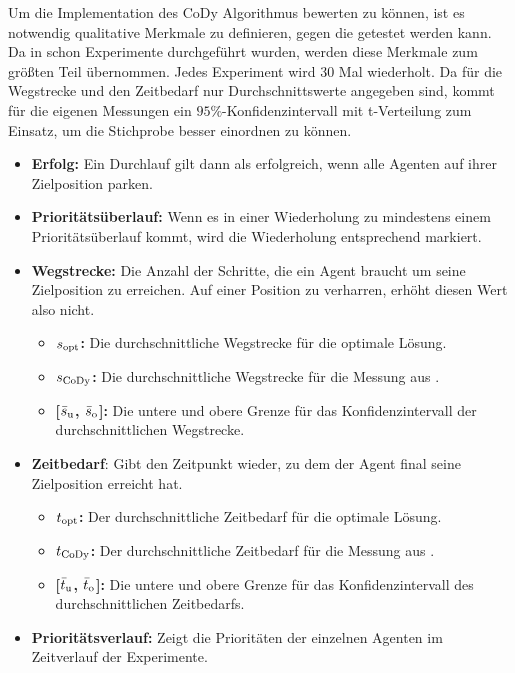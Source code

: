 Um die Implementation des CoDy Algorithmus bewerten zu können, ist es notwendig qualitative Merkmale zu definieren, gegen die getestet werden kann. Da in \cite{book:regele} schon Experimente durchgeführt wurden, werden diese Merkmale zum größten Teil übernommen. Jedes Experiment wird 30 Mal wiederholt. Da für die Wegstrecke und den Zeitbedarf nur Durchschnittswerte angegeben sind, kommt für die eigenen Messungen ein \(95\%\)-Konfidenzintervall mit t-Verteilung zum Einsatz, um die Stichprobe besser einordnen zu können.

\begin{itemize}
\item \textbf{Erfolg:} Ein Durchlauf gilt dann als erfolgreich, wenn alle Agenten auf ihrer Zielposition parken.
\item \textbf{Prioritätsüberlauf:} Wenn es in einer Wiederholung zu mindestens einem Prioritätsüberlauf kommt, wird die Wiederholung entsprechend markiert.
\item \textbf{Wegstrecke:} Die Anzahl der Schritte, die ein Agent braucht um seine Zielposition zu erreichen. Auf einer Position zu verharren, erhöht diesen Wert also nicht.
\begin{itemize}
    \item \textbf{\(s\textsubscript{opt}\):} Die durchschnittliche Wegstrecke für die optimale Lösung.
    \item \textbf{\(s\textsubscript{CoDy}\):} Die durchschnittliche Wegstrecke für die Messung aus \cite{book:regele}.
    \item \textbf{[\(\bar{s}\textsubscript{u}\), \(\bar{s}\textsubscript{o}\)]:} Die untere und obere Grenze für das Konfidenzintervall der durchschnittlichen Wegstrecke.
\end{itemize}
\item \textbf{Zeitbedarf}: Gibt den Zeitpunkt wieder, zu dem der Agent final seine Zielposition erreicht hat.
\begin{itemize}
    \item \textbf{\(t\textsubscript{opt}\):} Der durchschnittliche Zeitbedarf für die optimale Lösung.
    \item \textbf{\(t\textsubscript{CoDy}\):} Der durchschnittliche Zeitbedarf für die Messung aus \cite{book:regele}.
    \item \textbf{[\(\bar{t}\textsubscript{u}\), \(\bar{t}\textsubscript{o}\)]:} Die untere und obere Grenze für das Konfidenzintervall des durchschnittlichen Zeitbedarfs.
\end{itemize}
\item \textbf{Prioritätsverlauf:} Zeigt die Prioritäten der einzelnen Agenten im Zeitverlauf der Experimente.
\end{itemize}

